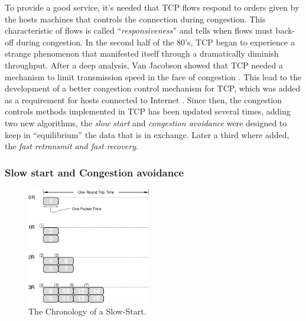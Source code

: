 To provide a good service, it's needed that TCP flows respond to orders given
by the hosts machines that controls the connection during congestion. This
characteristic of flows is called ``\textit{responsiveness}'' and tells when 
flows must back-off during congestion. In the second half of the 80's, TCP
began to experience a strange phenomenon that manifested itself through a
dramatically diminish throughput. After a deep analysis, Van Jacobson showed
that TCP needed a mechanism to limit transmission speed in the face of
congestion \cite{JacobsonCAC}. This lead to the development of a better
congestion control mechanism for TCP, which was added as a requirement for
hosts connected to Internet \cite{RFC1122}. Since then, the congestion controls
methods implemented in TCP has been updated several times, adding two new
algorithms, the \textit{slow start} and \textit{congestion avoidance} were
designed to keep in ``equilibrium'' the data that is in exchange. Later a
third where added, the \textit{fast retransmit and fast recovery}.

\subsubsection{Slow start and Congestion avoidance}

 \begin{figure}
  \begin{center}
    \includegraphics[width=0.48\textwidth]{img/slowstart}
  \end{center}
  \caption[The Chronology of a Slow-Start.]{The Chronology of a Slow-Start. \cite{JacobsonCAC}}
  \label{fig:slowstart}
\end{figure}

